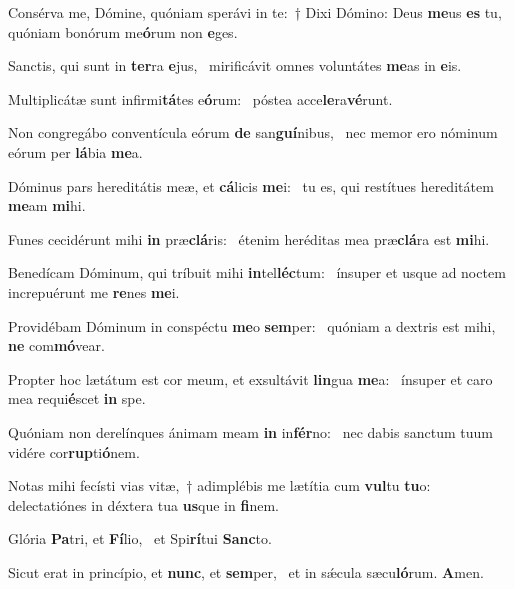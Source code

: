 \item Consérva me, Dómine, quóniam sperávi in te:~† Dixi Dómino: Deus \textbf{me}us \textbf{es} tu,~\psstar{} quóniam bonórum me\textbf{ó}rum non \textbf{e}ges.
\item Sanctis, qui sunt in \textbf{ter}ra \textbf{e}jus,~\psstar{} mirificávit omnes voluntátes \textbf{me}as in \textbf{e}is.
\item Multiplicátæ sunt infirmi\textbf{tá}tes e\textbf{ó}rum:~\psstar{} póstea acce\textbf{le}ra\textbf{vé}runt.
\item Non congregábo conventícula eórum \textbf{de} san\textbf{guí}nibus,~\psstar{} nec memor ero nóminum eórum per \textbf{lá}bia \textbf{me}a.
\item Dóminus pars hereditátis meæ, et \textbf{cá}licis \textbf{me}i:~\psstar{} tu es, qui restítues hereditátem \textbf{me}am \textbf{mi}hi.
\item Funes cecidérunt mihi \textbf{in} præ\textbf{clá}ris:~\psstar{} étenim heréditas mea præ\textbf{clá}ra est \textbf{mi}hi.
\item Benedícam Dóminum, qui tríbuit mihi \textbf{in}tel\textbf{léc}tum:~\psstar{} ínsuper et usque ad noctem increpuérunt me \textbf{re}nes \textbf{me}i.
\item Providébam Dóminum in conspéctu \textbf{me}o \textbf{sem}per:~\psstar{} quóniam a dextris est mihi, \textbf{ne} com\textbf{mó}vear.
\item Propter hoc lætátum est cor meum, et exsultávit \textbf{lin}gua \textbf{me}a:~\psstar{} ínsuper et caro mea requi\textbf{é}scet \textbf{in} spe.
\item Quóniam non derelínques ánimam meam \textbf{in} in\textbf{fér}no:~\psstar{} nec dabis sanctum tuum vidére cor\textbf{rup}ti\textbf{ó}nem.
\item Notas mihi fecísti vias vitæ,~† adimplébis me lætítia cum \textbf{vul}tu \textbf{tu}o:~\psstar{} delectatiónes in déxtera tua \textbf{us}que in \textbf{fi}nem.
\item Glória \textbf{Pa}tri, et \textbf{Fí}lio,~\psstar{} et Spi\textbf{rí}tui \textbf{Sanc}to.
\item Sicut erat in princípio, et \textbf{nunc}, et \textbf{sem}per,~\psstar{} et in sǽcula sæcu\textbf{ló}rum. \textbf{A}men.
